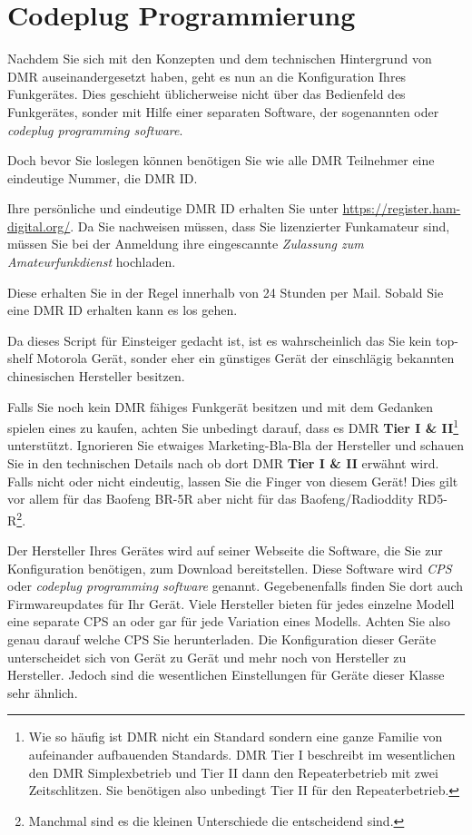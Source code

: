 \section{Codeplug Programmierung} \label{sec:codeplug}
Nachdem Sie sich mit den Konzepten und dem technischen Hintergrund von DMR auseinandergesetzt haben, geht es nun an die Konfiguration Ihres Funkgerätes. Dies geschieht üblicherweise nicht über das Bedienfeld des Funkgerätes, sonder mit Hilfe einer separaten Software, der sogenannten  oder \emph{codeplug programming software}. 

Doch bevor Sie loslegen können benötigen Sie wie alle DMR Teilnehmer eine eindeutige Nummer, die DMR ID.
\begin{hinweis}
 Ihre persönliche und eindeutige DMR ID erhalten Sie unter \url{https://register.ham-digital.org/}. Da Sie nachweisen müssen, dass Sie lizenzierter Funkamateur sind, müssen Sie bei der Anmeldung ihre eingescannte \emph{Zulassung zum Amateurfunkdienst} hochladen.
\end{hinweis}
Diese erhalten Sie in der Regel innerhalb von 24 Stunden per Mail. Sobald Sie eine DMR ID erhalten kann es los gehen.

Da dieses Script für Einsteiger gedacht ist, ist es wahrscheinlich das Sie kein top-shelf Motorola Gerät, sonder eher ein günstiges Gerät der einschlägig bekannten chinesischen Hersteller besitzen. 

\begin{achtung}
 Falls Sie noch kein DMR fähiges Funkgerät besitzen und mit dem Gedanken spielen eines zu kaufen, achten Sie unbedingt darauf, dass es DMR \textbf{Tier I \& II}\footnote{Wie so häufig ist DMR nicht ein Standard sondern eine ganze Familie von aufeinander aufbauenden Standards. DMR Tier I beschreibt im wesentlichen den DMR Simplexbetrieb und Tier II dann den Repeaterbetrieb mit zwei Zeitschlitzen. Sie benötigen also unbedingt Tier II für den Repeaterbetrieb.} unterstützt. Ignorieren Sie etwaiges Marketing-Bla-Bla der Hersteller und schauen Sie in den technischen Details nach ob dort DMR \textbf{Tier I \& II} erwähnt wird. Falls nicht oder nicht eindeutig, lassen Sie die Finger von diesem Gerät! Dies gilt vor allem für das Baofeng BR-5R aber nicht für das Baofeng/Radioddity RD5-R\footnote{Manchmal sind es die kleinen Unterschiede die entscheidend sind.}. 
\end{achtung}

Der Hersteller Ihres Gerätes wird auf seiner Webseite die Software, die Sie zur Konfiguration benötigen, zum Download bereitstellen. Diese Software wird \emph{CPS} oder \emph{codeplug programming software} genannt. Gegebenenfalls finden Sie dort auch Firmwareupdates für Ihr Gerät. Viele Hersteller bieten für jedes einzelne Modell eine separate CPS an oder gar für jede Variation eines Modells. Achten Sie also genau darauf welche CPS Sie herunterladen. Die Konfiguration dieser Geräte unterscheidet sich von Gerät zu Gerät und mehr noch von Hersteller zu Hersteller. Jedoch sind die wesentlichen Einstellungen für Geräte dieser Klasse sehr ähnlich.


